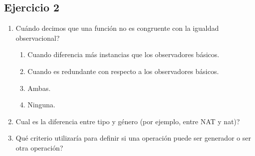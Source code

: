 \documentclass[10pt, a4paper]{report}
\begin{document}
\subsection*{Ejercicio 2}

\begin{enumerate}
 \item Cu\'ando decimos que una funci\'on no es congruente con la igualdad observacional?
  \begin{enumerate}
    \item Cuando diferencia m\'as instancias que los observadores b\'asicos.
    \item Cuando es redundante con respecto a los observadores b\'asicos.
    \item Ambas.
    \item Ninguna.
  \end{enumerate}
 \item Cual es la diferencia entre tipo y g\'enero (por ejemplo, entre NAT y nat)?
 \item Qu\'e criterio utilizar\'ia para definir si una operaci\'on puede ser generador o ser otra operaci\'on?
\end{enumerate}
\end{document}
